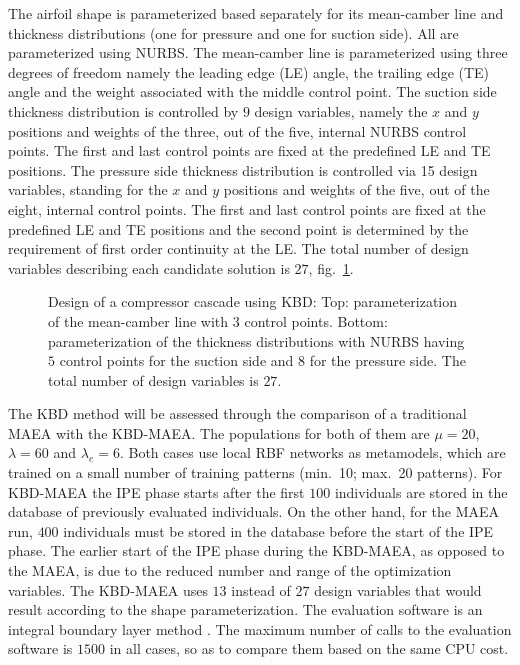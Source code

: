 The airfoil shape is parameterized based separately for its mean-camber line and thickness distributions (one for pressure and one for suction side). All are parameterized using NURBS. The mean-camber line is parameterized using three degrees of freedom namely the leading edge (LE) angle, the trailing edge (TE) angle and the weight associated with the middle control point. The suction side thickness distribution is controlled by $9$ design variables, namely the $x$ and $y$ positions and weights of the three, out of the five, internal NURBS control points. The first and last control points are fixed at the predefined LE and TE positions. The pressure side thickness distribution is controlled via 15 design variables, standing for the $x$ and $y$ positions and weights of the five, out of the eight, internal control points. The first and last control points are fixed at the predefined LE and TE positions and the second point is determined by the requirement of first order continuity at the LE.  The total number of design variables describing each candidate solution is $27$, fig.\ \ref{CBRparam}. 

\begin{figure}[h!]
\begin{minipage}[b]{1\linewidth}
 \centering
\end{minipage}
\caption{Design of a compressor cascade using KBD: Top: parameterization of the mean-camber line with $3$ control points. Bottom:  parameterization of the thickness distributions with NURBS having $5$ control points for the suction side and $8$ for the pressure side. The total number of design variables is $27$.} 
\label{CBRparam}
\end{figure}

The KBD method will be assessed through the comparison of a traditional MAEA with the KBD-MAEA. The populations for both of them are $\mu=20$, $\lambda=60$ and $\lambda_e=6$. Both cases use local RBF networks as metamodels, which are trained on a small number of training patterns (min.\ 10; max.\ 20 patterns). For KBD-MAEA the IPE phase starts after the first $100$ individuals are stored in the database of previously evaluated individuals. On the other hand, for the MAEA run, $400$ individuals must be stored in the database before the start of the IPE phase. The earlier start of the IPE phase during the KBD-MAEA, as opposed to the MAEA, is due to the reduced number and range of the optimization variables. The KBD-MAEA uses $13$ instead of $27$ design variables that would result according to the shape parameterization. The evaluation software is an integral boundary layer method \cite{Drel1987}. The maximum number of calls to the evaluation software is $1500$ in all cases, so as to compare them based on the same CPU cost.              

